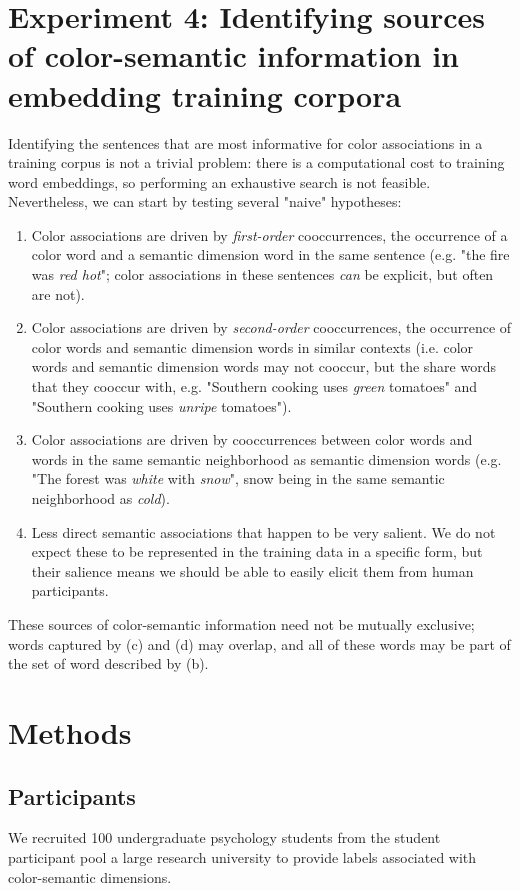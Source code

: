 \documentclass[10pt,letterpaper]{article}
\begin{document}
\section{Experiment 4: Identifying sources of color-semantic information in embedding training corpora}
Identifying the sentences that are most informative for color associations in a training corpus is not a trivial problem: there is a computational cost to training word embeddings, so performing an exhaustive search is not feasible. Nevertheless, we can start by testing several "naive" hypotheses:
\begin{enumerate}[label=(\alph*)]
\item Color associations are driven by \emph{first-order} cooccurrences, the occurrence of a color word and a semantic dimension word in the same sentence (e.g. "the fire was \emph{red hot}"; color associations in these sentences \emph{can} be explicit, but often are not).
\item Color associations are driven by \emph{second-order} cooccurrences, the occurrence of color words and semantic dimension words in similar contexts (i.e. color words and semantic dimension words may not cooccur, but the share words that they cooccur with, e.g. "Southern cooking uses \emph{green} tomatoes" and "Southern cooking uses \emph{unripe} tomatoes").
\item Color associations are driven by cooccurrences between color words and words in the same semantic neighborhood as semantic dimension words (e.g. "The forest was \emph{white} with \emph{snow}", snow being in the same semantic neighborhood as \emph{cold}).
\item Less direct semantic associations that happen to be very salient. We do not expect these to be represented in the training data in a specific form, but their salience means we should be able to easily elicit them from human participants.
\end{enumerate}
These sources of color-semantic information need not be mutually exclusive; words captured by (c) and (d) may overlap, and all of these words may be part of the set of word described by (b).

\section{Methods}

\subsection{Participants}
We recruited 100 undergraduate psychology students from the student participant pool a large research university to provide labels associated with color-semantic dimensions.
\end{document}
